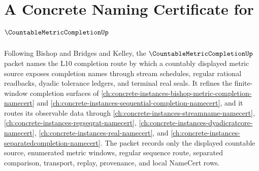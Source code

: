\chapter{A Concrete Naming Certificate for $\CountableMetricCompletionUp$}
\label{ch:concrete-instances-countable-metric-completion-namecert}

Following Bishop and Bridges and Kelley, the $\CountableMetricCompletionUp$ packet names the L10 completion route by which a countably displayed metric source exposes completion names through stream schedules, regular rational readbacks, dyadic tolerance ledgers, and terminal real seals. It refines the finite-window completion surfaces of \autoref{ch:concrete-instances-bishop-metric-completion-namecert} and \autoref{ch:concrete-instances-sequential-completion-namecert}, and it routes its observable data through \autoref{ch:concrete-instances-streamname-namecert}, \autoref{ch:concrete-instances-regseqrat-namecert}, \autoref{ch:concrete-instances-dyadicratcore-namecert}, \autoref{ch:concrete-instances-real-namecert}, and \autoref{ch:concrete-instances-separatedcompletion-namecert}. The packet records only the displayed countable source, enumerated metric windows, regular sequence route, separated comparison, transport, replay, provenance, and local NameCert rows.

